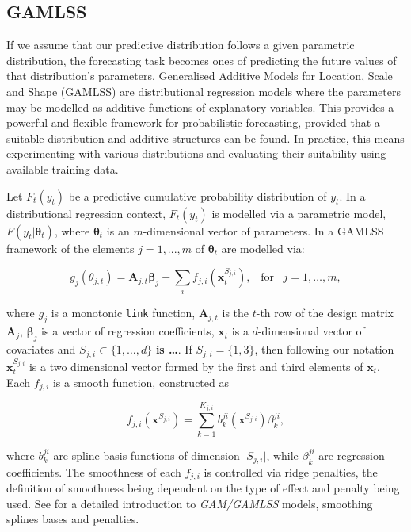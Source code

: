 \documentclass[]{elsarticle} %
\begin{document}
\hypertarget{gamlss}{%
\subsection{GAMLSS}\label{gamlss}}

If we assume that our predictive distribution follows a given parametric distribution, the forecasting task becomes ones of predicting the future values of that distribution's parameters. Generalised Additive Models for Location, Scale and Shape (GAMLSS) are distributional regression models where the parameters may be modelled as additive functions of explanatory variables. This provides a powerful and flexible framework for probabilistic forecasting, provided that a suitable distribution and additive structures can be found. In practice, this means experimenting with various distributions and evaluating their suitability using available training data.

Let \(F_t(y_t)\) be a predictive cumulative probability distribution of \(y_t\). In a distributional regression context, \(F_t(y_t)\) is modelled via a parametric model, \(F(y_t|\bm \theta_t)\), where \(\bm \theta_t\) is an \(m\)-dimensional vector of parameters. In a GAMLSS framework of \citet{Rigby2005} the elements \(j=1,...,m\) of \(\bm \theta_t\) are modelled via:

\begin{equation}
    g_j(\theta_{j,t})=\mathbf{A}_{j,t} \bm{\beta}_j + \sum_{i} f_{j,i}({\bm x}^{S_{j,i}}_t), \;\;\; \text{for} \;\;\; j = 1, \dots, m,
    \label{eq:basicGAM}
\end{equation}

where \(g_j\) is a monotonic \texttt{link} function, \(\mathbf{A}_{j,t}\) is the \(t\)-th row of the design matrix \(\mathbf{A}_j\), \(\bm \beta_j\) is a vector of regression coefficients, \(\bm x_t\) is a \(d\)-dimensional vector of covariates and \(S_{j,i} \subset \{1, \dots, d\}\) \textbf{is \ldots{}}. If \(S_{j,i} = \{1, 3\}\), then following our notation \({\bm x}_{t}^{S_{j,i}}\) is a two dimensional vector formed by the first and third elements of \(\bm x_t\). Each \(f_{j,i}\) is a smooth function, constructed as

\begin{equation}
    f_{j,i}(\bm x^{S_{j,i}}) = \sum_{k=1}^{K_{j,i}} b^{ji}_k (\bm x^{S_{j,i}}) \beta_k^{ji},
    \label{eq:smmothfunction}
\end{equation}

where \(b^{ji}_k\) are spline basis functions of dimension \(\vert S_{j,i} \vert\), while \(\beta_k^{ji}\) are regression coefficients. The smoothness of each \(f_{j,i}\) is controlled via ridge penalties, the definition of smoothness being dependent on the type of effect and penalty being used. See \citet{Wood2017} for a detailed introduction to \emph{GAM/GAMLSS} models, smoothing splines bases and penalties.
\end{document}
